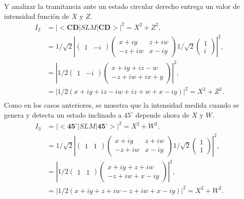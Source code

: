 Y analizar la tramitancia ante un estado circular derecho entrega un
valor de intensidad función de $X$ y $Z$.
\begin{align*}
I_2 &= |<\mathbf{CD}|SLM|\mathbf{CD}>|^2 = X^2+Z^2,\\
&=  1/\sqrt{2}\left|\begin{pmatrix} 1&-i\end{pmatrix} 
       \begin{pmatrix}
         x+iy & z+iw \\-z+iw & x-iy
       \end{pmatrix} 1/\sqrt{2}\begin{pmatrix}1\\i\end{pmatrix}\right|^2 ,\\
&=  \left|1/2\begin{pmatrix} 1&-i\end{pmatrix} 
       \begin{pmatrix} x+iy +iz-w\\-z+iw +ix+y\end{pmatrix} \right|^2 ,\\
&=  \left|1/2\left(x+iy+iz-iw+iz+w+x-iy\right)\right|^2 =  X^2+Z^2.\\
\end{align*}
Como en los casos anteriores, se muestra que la intensidad medida
cuando se genera y detecta un estado inclinado a $45^{\circ}$ depende
ahora de $X$ y $W$.
\begin{align*}
I_3 &= |<\mathbf{45^{\circ}}|SLM|\mathbf{45^{\circ}}>|^2 = X^2+W^2,\\
&=  1/\sqrt{2}\left|\begin{pmatrix} 1&1\end{pmatrix} 
       \begin{pmatrix}
         x+iy & z+iw \\-z+iw & x-iy
       \end{pmatrix} 1/\sqrt{2}\begin{pmatrix}1\\1\end{pmatrix}\right|^2 ,\\
&=  \left|1/2\begin{pmatrix} 1&1\end{pmatrix} 
       \begin{pmatrix} x+iy +z+iw\\-z+iw +x-iy\end{pmatrix} \right|^2, \\
&=  \left|1/2\left(x+iy+z+iw-z+iw+x-iy\right)\right|^2 =  X^2+W^2.\\
\end{align*}
